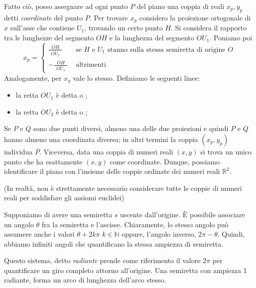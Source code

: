 \documentclass[a4paper]{article}
\begin{document}
\DeclareRobustCommand{\widefrac}[3][5pt]{%
  \frac{\hspace{#1}#2\hspace{#1}}{\hspace{#1}#3\hspace{#1}}}

Fatto ciò, posso assegnare ad ogni punto \(P\) del piano una coppia di reali \(x_p, y_p\)
detti \textit{coordinate} del punto \(P\).
Per trovare \(x_p\) considero la proiezione ortogonale di \(x\) sull'asse che contiene \(U_1\),
trovando un certo punto \(H\). Si considera il rapporto tra le lunghezze del segmento \(\overline{OH}\)
e la lunghezza del segmento \(\overline{OU_1}\). Poniamo poi
\[
    x_p = \begin{cases}
        \widefrac{\overline{OH}}{\overline{OU_1}} & \text{ se } H \text{ e } U_1 \text{ stanno sulla stessa semiretta di origine } O \\
        -\widefrac{\overline{OH}}{\overline{OU_1}} & \text{ altrimenti}
    \end{cases}
\]
Analogamente, per \(x_y\) vale lo stesso.
Definiamo le seguenti linee:
\begin{itemize}
    \item la retta \(OU_1\) è detta  o ;
    \item la retta \(OU_2\) è detta  o ;
\end{itemize}

Se \(P\) e \(Q\) sono due punti diversi, almeno una delle due proiezioni e quindi \(P\)
e \(Q\) hanno almeno una coordinata diversa; in altri termini la coppia \((x_p, y_p)\)
individua \(P\). Viceversa, data una coppia di numeri reali \((x,y)\) si trova
un unico punto che ha esattamente \((x,y)\) come coordinate.
Dunque, possiamo identificare il piano con l'insieme delle coppie ordinate dei numeri reali \({\mathbb{R}}^2\).

(In realtà, non è strettamente necessario considerare tutte le coppie di numeri reali
per soddisfare gli assiomi euclidei)

Supponiamo di avere una semiretta \(s\) uscente dall'origine.
È possibile associare un angolo \(\theta\) fra la semiretta e l'ascisse.
Chiaramente, lo stesso angolo può assumere anche i valori \(\theta +2k\pi\) \(k\in\mathbb{N}\) oppure,
l'angolo inverso, \(2\pi-\theta\). Quindi, abbiamo infiniti angoli che quantificano la stessa
ampiezza di semiretta.

Questo sistema, detto \textit{radiante}
prende come riferimento il valore \(2\pi\) per quantificare un giro completo attorno all'origine.
Una semiretta con ampiezza 1 radiante, forma un arco di lunghezza dell'arco stesso.
\end{document}
